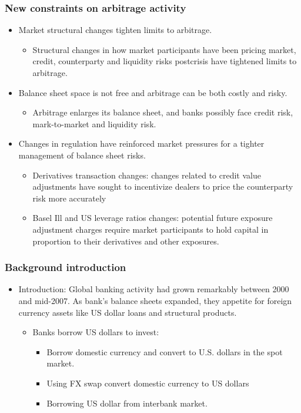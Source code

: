\subsubsection{New constraints on arbitrage activity}
\begin{itemize}
\item Market structural changes tighten limits to arbitrage.
  \begin{itemize}
  \item Structural changes in how market participants have been pricing market, credit, counterparty and liquidity risks postcrisis have tightened limits to arbitrage.
  \end{itemize}
\item Balance sheet space is not free and arbitrage can be both costly and risky.
  \begin{itemize}
  \item Arbitrage enlarges its balance sheet, and banks possibly face credit risk, mark-to-market and liquidity risk.
  \end{itemize}
\item Changes in regulation have reinforced market pressures for a tighter management of balance sheet risks.
  \begin{itemize}
  \item Derivatives transaction changes: changes related to credit value adjustments have sought to incentivize dealers to price the counterparty risk more accurately
  \item Basel Ill and US leverage ratios changes: potential future exposure adjustment charges require market participants to hold capital in proportion to their derivatives and other exposures.
  \end{itemize}
\end{itemize}





\subsubsection{Background introduction}
\begin{itemize}
\item Introduction: Global banking activity had grown remarkably between 2000 and mid-2007. As bank's balance sheets expanded, they appetite for foreign currency assets like US dollar loans and structural products.
  \begin{itemize}
  \item Banks borrow US dollars to invest:
    \begin{itemize}
    \item Borrow domestic currency and convert to U.S. dollars in the spot market.
    \item Using FX swap convert domestic currency to US dollars
    \item Borrowing US dollar from interbank market.
    \end{itemize}
    
  \end{itemize}
\end{itemize}



